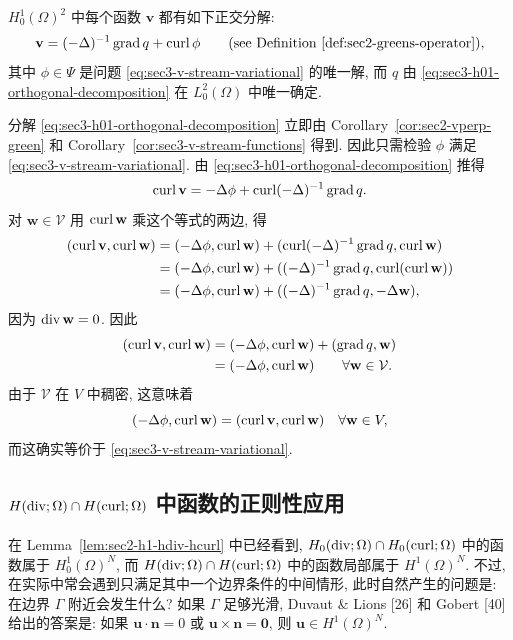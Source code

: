 \setcounter{statement}{2}
\begin{Theorem}\label{thm:sec3-h01-orthogonal-decomposition}
$H_0^1(\Omega)^2$ 中每个函数 $\mathbf v$ 都有如下正交分解:
\begin{equation}\label{eq:sec3-h01-orthogonal-decomposition}
\mathbf v=(-\Delta)^{-1}\operatorname{grad} q+\operatorname{curl}\phi
\qquad\text{(see Definition~\ref{def:sec2-greens-operator})},
\end{equation}
其中 $\phi\in\Psi$ 是问题 \eqref{eq:sec3-v-stream-variational} 的唯一解,
而 $q$ 由 \eqref{eq:sec3-h01-orthogonal-decomposition} 在 $L_0^2(\Omega)$ 中唯一确定.
\end{Theorem}
\begin{Proof}
分解 \eqref{eq:sec3-h01-orthogonal-decomposition} 立即由
Corollary~\ref{cor:sec2-vperp-green} 和
Corollary~\ref{cor:sec3-v-stream-functions} 得到. 因此只需检验 $\phi$ 满足
\eqref{eq:sec3-v-stream-variational}. 由 \eqref{eq:sec3-h01-orthogonal-decomposition} 推得
\[
\operatorname{curl}\mathbf v=-\Delta\phi+\operatorname{curl}(-\Delta)^{-1}\operatorname{grad} q.
\]
对 $\mathbf w\in\mathcal V$ 用 $\operatorname{curl}\mathbf w$ 乘这个等式的两边, 得
\begin{align*}
(\operatorname{curl}\mathbf v,\operatorname{curl}\mathbf w)
&=(-\Delta\phi,\operatorname{curl}\mathbf w)
+(\operatorname{curl}(-\Delta)^{-1}\operatorname{grad} q,\operatorname{curl}\mathbf w)\\
&=(-\Delta\phi,\operatorname{curl}\mathbf w)
+((-\Delta)^{-1}\operatorname{grad} q,\operatorname{curl}(\operatorname{curl}\mathbf w))\\
&=(-\Delta\phi,\operatorname{curl}\mathbf w)
+((-\Delta)^{-1}\operatorname{grad} q,-\Delta\mathbf w),
\end{align*}
因为 $\operatorname{div}\mathbf w=0$. 因此
\begin{align*}
(\operatorname{curl}\mathbf v,\operatorname{curl}\mathbf w)
&=(-\Delta\phi,\operatorname{curl}\mathbf w)+(\operatorname{grad} q,\mathbf w)\\
&=(-\Delta\phi,\operatorname{curl}\mathbf w)
\qquad\forall\mathbf w\in\mathcal V.
\end{align*}
由于 $\mathcal V$ 在 $V$ 中稠密, 这意味着
\[
(-\Delta\phi,\operatorname{curl}\mathbf w)=(\operatorname{curl}\mathbf v,\operatorname{curl}\mathbf w)
\quad\forall\mathbf w\in V,
\]
而这确实等价于 \eqref{eq:sec3-v-stream-variational}.
\end{Proof}

\setcounter{subsection}{1}
\subsection{$H(\operatorname{div};\Omega)\cap H(\operatorname{curl};\Omega)$ 中函数的正则性应用}
\label{subsec:sec3-hdiv-hcurl-regularity}

在 Lemma~\ref{lem:sec2-h1-hdiv-hcurl} 中已经看到,
$H_0(\operatorname{div};\Omega)\cap H_0(\operatorname{curl};\Omega)$ 中的函数属于 $H_0^1(\Omega)^N$,
而 $H(\operatorname{div};\Omega)\cap H(\operatorname{curl};\Omega)$ 中的函数局部属于 $H^1(\Omega)^N$.
不过, 在实际中常会遇到只满足其中一个边界条件的中间情形, 此时自然产生的问题是:
在边界 $\Gamma$ 附近会发生什么? 如果 $\Gamma$ 足够光滑, Duvaut \& Lions [26]
和 Gobert [40] 给出的答案是: 如果 $\mathbf u\cdot\mathbf n=0$ 或
$\mathbf u\times\mathbf n=\mathbf0$, 则 $\mathbf u\in H^1(\Omega)^N$.

